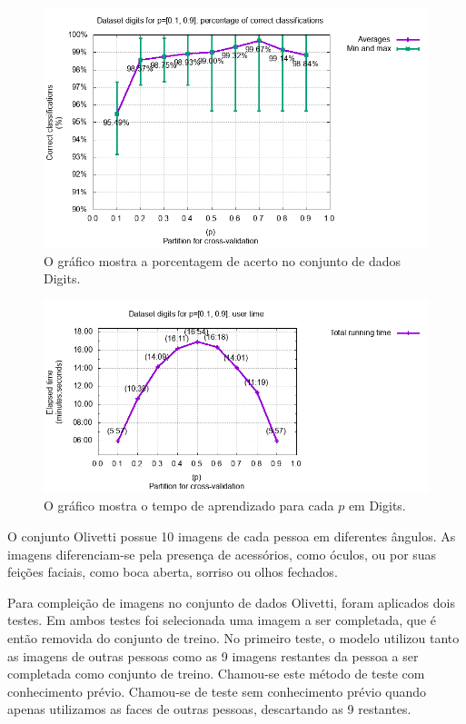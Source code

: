 \documentclass[12pt]{article}
\theoremstyle{plain}
\numberwithin{equation}{section}
\begin{document}
\begin{figure}[h]
  \centering\includegraphics[scale=0.8]{imgs/digits_percs.png}
  \caption{O gráfico mostra a porcentagem de acerto no conjunto de dados Digits.}
\end{figure}

\begin{figure}[H]
  \centering\includegraphics[scale=0.9]{imgs/digits_time.png}
  \caption{O gráfico mostra o tempo de aprendizado para cada $p$ em Digits.}
\end{figure}

O conjunto Olivetti possue 10 imagens de cada pessoa em diferentes ângulos. As imagens
diferenciam-se pela presença de acessórios, como óculos, ou por suas feições faciais, como boca
aberta, sorriso ou olhos fechados.

Para compleição de imagens no conjunto de dados Olivetti, foram aplicados dois testes. Em ambos
testes foi selecionada uma imagem a ser completada, que é então removida do conjunto de treino. No
primeiro teste, o modelo utilizou tanto as imagens de outras pessoas como as 9 imagens restantes da
pessoa a ser completada como conjunto de treino. Chamou-se este método de teste com conhecimento
prévio. Chamou-se de teste sem conhecimento prévio quando apenas utilizamos as faces de outras
pessoas, descartando as 9 restantes.
\end{document}
